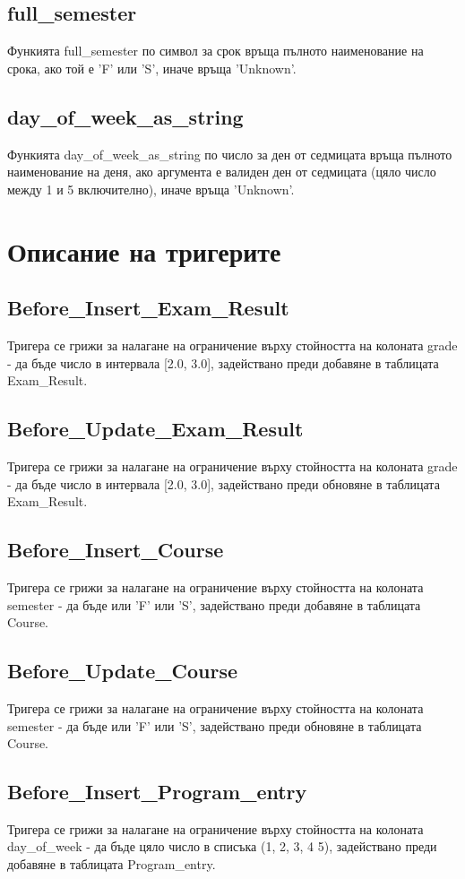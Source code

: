 \documentclass[a4paper, 12pt, x11names]{article}
\begin{document}
\subsection{full\_semester}
Функията full\_semester по символ за срок връща пълното наименование на срока, ако той е 'F' или 'S',
иначе връща 'Unknown'.
\subsection{day\_of\_week\_as\_string}
Функията day\_of\_week\_as\_string по число за ден от седмицата връща пълното наименование на деня,
ако аргумента е валиден ден от седмицата (цяло число между 1 и 5 включително),
иначе връща 'Unknown'.
\section{Описание на тригерите}
\subsection{Before\_Insert\_Exam\_Result}
Тригера се грижи за налагане на ограничение върху
стойността на колоната grade - да бъде число в интервала [2.0, 3.0],
задействано преди добавяне в таблицата Exam\_Result.
\subsection{Before\_Update\_Exam\_Result}
Тригера се грижи за налагане на ограничение върху
стойността на колоната grade - да бъде число в интервала [2.0, 3.0],
задействано преди обновяне в таблицата Exam\_Result.
\subsection{Before\_Insert\_Course}
Тригера се грижи за налагане на ограничение върху
стойността на колоната semester - да бъде или 'F' или 'S',
задействано преди добавяне в таблицата Course.
\subsection{Before\_Update\_Course}
Тригера се грижи за налагане на ограничение върху
стойността на колоната semester - да бъде или 'F' или 'S',
задействано преди обновяне в таблицата Course.
\subsection{Before\_Insert\_Program\_entry}
Тригера се грижи за налагане на ограничение върху
стойността на колоната day\_of\_week - да бъде цяло число в списъка (1, 2, 3, 4 5),
задействано преди добавяне в таблицата Program\_entry.
\end{document}
